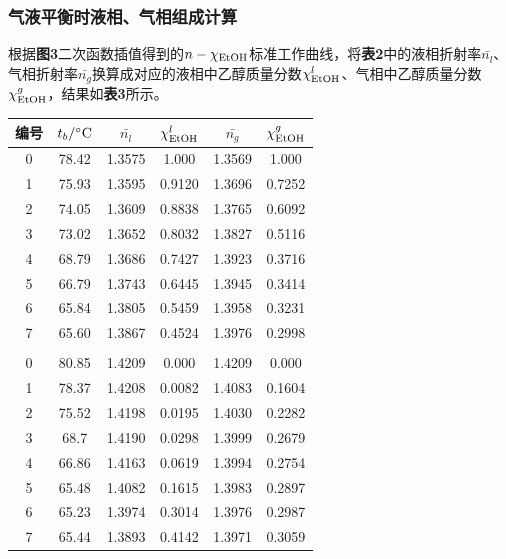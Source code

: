 \documentclass[12pt]{article}
\begin{document}
			\subsubsection{气液平衡时液相、气相组成计算}
				根据\textbf{图3}二次函数插值得到的$n-\chi_{\ce{EtOH}}$标准工作曲线，将\textbf{表2}中的液相折射率$\bar{n_{l}}$、气相折射率$\bar{n_{g}}$换算成对应的液相中乙醇质量分数$\chi^{l}_{\ce{EtOH}}$、气相中乙醇质量分数$\chi^{g}_{\ce{EtOH}}$，结果如\textbf{表3}所示。
				\begin{table}[h]
					\centering
					\begin{tabular}{cccccc}
						\toprule
						编号 & $t_{b}/{\rm ^{\circ}C}$ & $\bar{n_{l}}$ & $\chi^{l}_{\rm EtOH}$ &  $\bar{n_{g}}$& $\chi^{g}_{\ce{EtOH}}$ \\
						\midrule
						0 & 78.42 & 1.3575 & 1.000   & 1.3569 & 1.000  \\
						1 & 75.93 & 1.3595 & 0.9120 & 1.3696 & 0.7252 \\
						2 & 74.05 & 1.3609 & 0.8838 & 1.3765 & 0.6092 \\
						3 & 73.02 & 1.3652 & 0.8032 & 1.3827 & 0.5116 \\
						4 & 68.79 & 1.3686 & 0.7427 & 1.3923 & 0.3716  \\
						5 & 66.79 & 1.3743 & 0.6445 & 1.3945 & 0.3414 \\
						6 & 65.84 & 1.3805 & 0.5459 & 1.3958 & 0.3231 \\
						7 & 65.60 & 1.3867 & 0.4524 & 1.3976 & 0.2998 \\
						  &       &        &             &        &     \\
						0 & 80.85 & 1.4209 & 0.000    & 1.4209 & 0.000  \\
						1 & 78.37 & 1.4208 & 0.0082 & 1.4083 & 0.1604 \\
						2 & 75.52 & 1.4198 & 0.0195 & 1.4030 & 0.2282 \\
						3 & 68.7  & 1.4190 & 0.0298 & 1.3999 & 0.2679 \\
						4 & 66.86 & 1.4163 & 0.0619 & 1.3994 & 0.2754 \\
						5 & 65.48 & 1.4082 & 0.1615 & 1.3983 & 0.2897 \\
						6 & 65.23 & 1.3974 & 0.3014 & 1.3976 & 0.2987 \\
						7 & 65.44 & 1.3893 & 0.4142 & 1.3971 & 0.3059 \\	
						\bottomrule
					\end{tabular}
				\end{table}
				\par
\end{document}
